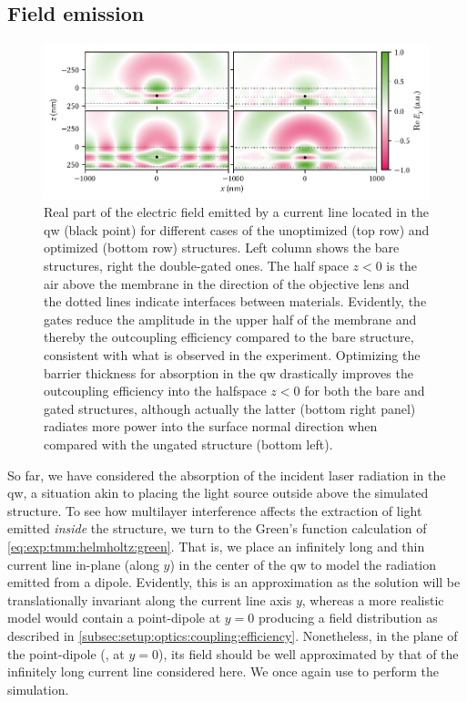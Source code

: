 \subsection{Field emission}\label{subsec:exp:tmm:green}
\begin{figure}
    \centering
    \includegraphics{img/pdf/experiment/tmm_green}
    \caption[]{
        Real part of the electric field emitted by a current line located in the \gls{qw} (black point) for different cases of the unoptimized (top row) and optimized (bottom row) structures.
        Left column shows the bare structures, right the double-gated ones.
        The half space $z<0$ is the air above the membrane in the direction of the objective lens and the dotted lines indicate interfaces between materials.
        Evidently, the gates reduce the amplitude in the upper half of the membrane and thereby the outcoupling efficiency compared to the bare structure, consistent with what is observed in the experiment.
        Optimizing the barrier thickness for absorption in the \gls{qw} drastically improves the outcoupling efficiency into the halfspace $z<0$ for both the bare and gated structures, although actually the latter (bottom right panel) radiates more power into the surface normal direction when compared with the ungated structure (bottom left).
    }
    \label{fig:exp:tmm:green}
\end{figure}

So far, we have considered the absorption of the incident laser radiation in the \gls{qw}, a situation akin to placing the light source outside above the simulated structure.
To see how multilayer interference affects the extraction of light emitted \emph{inside} the structure, we turn to the Green's function calculation of \cref{eq:exp:tmm:helmholtz:green}.
That is, we place an infinitely long and thin current line in-plane (along $y$) in the center of the \gls{qw} to model the radiation emitted from a dipole.
Evidently, this is an approximation as the solution will be translationally invariant along the current line axis $y$, whereas a more realistic model would contain a point-dipole at $y=0$ producing a field distribution as described in \cref{subsec:setup:optics:coupling:efficiency}.
Nonetheless, in the plane of the point-dipole (\ie, at $y=0$), its field should be well approximated by that of the infinitely long current line considered here.
We once again use \pymoosh to perform the simulation.

